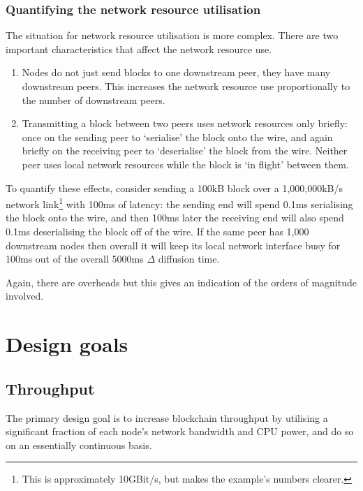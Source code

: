 \documentclass[11pt,a4paper]{article}
\begin{document}
\subsubsection{Quantifying the network resource utilisation}
The situation for network resource utilisation is more complex. There are two
important characteristics that affect the network resource use.
\begin{enumerate}
\item Nodes do not just send blocks to one downstream peer, they have many
      downstream peers. This increases the network resource use proportionally
      to the number of downstream peers.
\item Transmitting a block between two peers uses network resources only
      briefly: once on the sending peer to `serialise' the block onto the wire,
      and again briefly on the receiving peer to `deserialise' the block from
      the wire. Neither peer uses local network resources while the block is
      `in flight' between them.
\end{enumerate}
To quantify these effects, consider sending a 100kB block over a 1,000,000kB/s
network link\footnote{This is approximately 10GBit/s, but makes the example's
numbers clearer.} with 100ms of latency: the sending end will spend 0.1ms
serialising the block onto the wire, and then 100ms later the receiving end
will also spend 0.1ms deserialising the block off of the wire. If the same peer
has 1,000 downstream nodes then overall it will keep its local network interface
busy for 100ms out of the overall 5000ms $\Delta$ diffusion time.

Again, there are overheads but this gives an indication of the orders of
magnitude involved.

\section{Design goals}

\subsection{Throughput}

The primary design goal is to increase blockchain throughput by utilising a
significant fraction of each node's network bandwidth and CPU power, and do so
on an essentially continuous basis.
\end{document}
